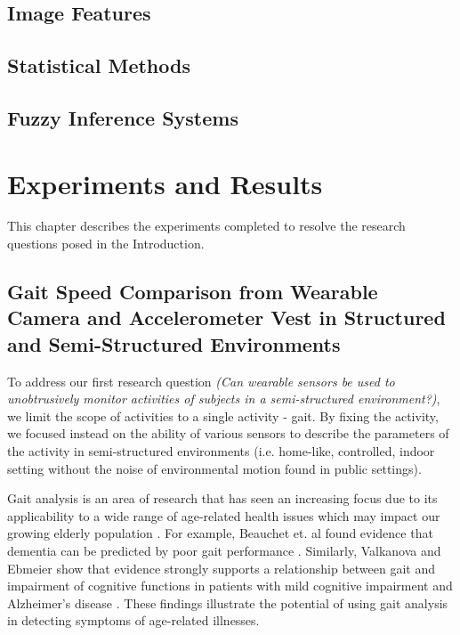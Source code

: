 \documentclass[12pt]{report}
\begin{document}
\section{Image Features}

\section{Statistical Methods}

\section{Fuzzy Inference Systems}

\chapter{Experiments and Results}

This chapter describes the experiments completed to resolve the research questions posed in the Introduction.

\section{Gait Speed Comparison from Wearable Camera and Accelerometer Vest in Structured and Semi-Structured Environments}
To address our first research question \emph{(Can wearable sensors be used to unobtrusively monitor activities of subjects in a semi-structured environment?)}, we limit the scope of activities to a single activity - gait. By fixing the activity, we focused instead on the ability of various sensors to describe the parameters of the activity in semi-structured environments (i.e. home-like, controlled, indoor setting without the noise of environmental motion found in public settings).

Gait analysis is an area of research that has seen an increasing focus due to its applicability to a wide range of age-related health issues which may impact our growing elderly population \cite{Ortman2014AnStates}. For example, Beauchet et. al found evidence that dementia can be predicted by poor gait performance \cite{Beauchet2016PoorMeta-Analysis}. Similarly, Valkanova and Ebmeier show that evidence strongly supports a relationship between gait and impairment of cognitive functions in patients with mild cognitive impairment and Alzheimer's disease \cite{Valkanova2017WhatEvidence}. These findings illustrate the potential of using gait analysis in detecting symptoms of age-related illnesses.
\end{document}
